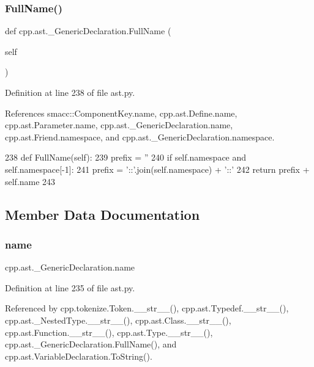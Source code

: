\subsubsection{\texorpdfstring{Full\+Name()}{FullName()}}
{\footnotesize\ttfamily def cpp.\+ast.\+\_\+\+Generic\+Declaration.\+Full\+Name (\begin{DoxyParamCaption}\item[{}]{self }\end{DoxyParamCaption})}



Definition at line 238 of file ast.\+py.



References smacc\+::\+Component\+Key.\+name, cpp.\+ast.\+Define.\+name, cpp.\+ast.\+Parameter.\+name, cpp.\+ast.\+\_\+\+Generic\+Declaration.\+name, cpp.\+ast.\+Friend.\+namespace, and cpp.\+ast.\+\_\+\+Generic\+Declaration.\+namespace.


\begin{DoxyCode}
238     \textcolor{keyword}{def }FullName(self):
239         prefix = \textcolor{stringliteral}{''}
240         \textcolor{keywordflow}{if} self.namespace \textcolor{keywordflow}{and} self.namespace[-1]:
241             prefix = \textcolor{stringliteral}{'::'}.join(self.namespace) + \textcolor{stringliteral}{'::'}
242         \textcolor{keywordflow}{return} prefix + self.name
243 
\end{DoxyCode}


\subsection{Member Data Documentation}
\mbox{\label{classcpp_1_1ast_1_1__GenericDeclaration_af774f4729dfd78d0538a6782fe8514c1}} 
\subsubsection{\texorpdfstring{name}{name}}
{\footnotesize\ttfamily cpp.\+ast.\+\_\+\+Generic\+Declaration.\+name}



Definition at line 235 of file ast.\+py.



Referenced by cpp.\+tokenize.\+Token.\+\_\+\+\_\+str\+\_\+\+\_\+(), cpp.\+ast.\+Typedef.\+\_\+\+\_\+str\+\_\+\+\_\+(), cpp.\+ast.\+\_\+\+Nested\+Type.\+\_\+\+\_\+str\+\_\+\+\_\+(), cpp.\+ast.\+Class.\+\_\+\+\_\+str\+\_\+\+\_\+(), cpp.\+ast.\+Function.\+\_\+\+\_\+str\+\_\+\+\_\+(), cpp.\+ast.\+Type.\+\_\+\+\_\+str\+\_\+\+\_\+(), cpp.\+ast.\+\_\+\+Generic\+Declaration.\+Full\+Name(), and cpp.\+ast.\+Variable\+Declaration.\+To\+String().


